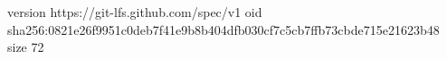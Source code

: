 version https://git-lfs.github.com/spec/v1
oid sha256:0821e26f9951c0deb7f41e9b8b404dfb030cf7c5cb7ffb73cbde715e21623b48
size 72
